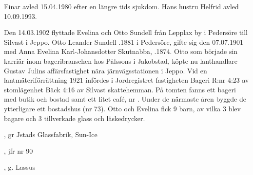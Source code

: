 Einar avled 15.04.1980 efter en längre tids sjukdom. Hans hustru Helfrid avled 10.09.1993.



%
Den 14.03.1902  flyttade Evelina och Otto Sundell från Lepplax by i Pedersöre till Silvast i Jeppo. Otto Leander Sundell .1881 i Pedersöre, gifte sig den 07.07.1901 med Anna Evelina Karl-Johansdotter Skutnabba, .1874. Otto som började sin karriär inom bageribranschen hos Pålssons i Jakobstad, köpte nu lanthandlare Gustav Julins affärsfastighet nära järnvägsstationen i Jeppo. Vid en lantmäteriförrättning 1921 infördes i Jordregistret fastigheten Bageri R:nr 4:23 av stomlägenhet Bäck 4:16 av Silvast skattehemman. På tomten fanns ett bageri med butik och bostad samt ett litet café, nr . Under de närmaste åren byggde de ytterligare ett bostadshus (nr 73). Otto och Evelina fick 9 barn, av vilka 3 blev bagare och 3 tillverkade glass och läskedrycker.
\begin{jhchildren}
  \item {}
  \item {}
  \item {}
  \item {}
  \item {}, gr Jstads Glassfabrik, Sun-Ice
  \item {}
  \item {}, jfr nr 90
  \item {}
  \item {}, g. Lassus
\end{jhchildren}

